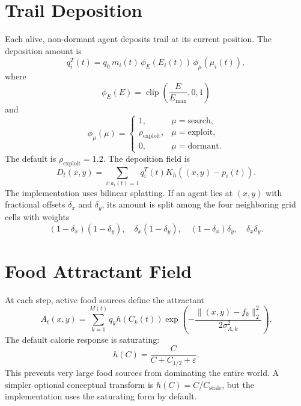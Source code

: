 \documentclass[11pt]{article}
\begin{document}
\section{Trail Deposition}
Each alive, non-dormant agent deposits trail at its current position. The
deposition amount is
\begin{equation}
  q_i^T(t)=q_0\,m_i(t)\,\phi_E(E_i(t))\,\phi_\mu(\mu_i(t)),
\end{equation}
where
\begin{equation}
  \phi_E(E)=\operatorname{clip}\left(\frac{E}{E_{\max}},0,1\right)
\end{equation}
and
\begin{equation}
  \phi_\mu(\mu)=
  \begin{cases}
  1, & \mu=\mathrm{search},\\
  \rho_{\mathrm{exploit}}, & \mu=\mathrm{exploit},\\
  0, & \mu=\mathrm{dormant}.
  \end{cases}
\end{equation}
The default is $\rho_{\mathrm{exploit}}=1.2$. The deposition field is
\begin{equation}
  D_t(x,y)=\sum_{i:a_i(t)=1}q_i^T(t)K_h((x,y)-p_i(t)).
\end{equation}
The implementation uses bilinear splatting. If an agent lies at $(x,y)$ with
fractional offsets $\delta_x$ and $\delta_y$, its amount is split among the four
neighboring grid cells with weights
\begin{equation}
  (1-\delta_x)(1-\delta_y),\quad
  \delta_x(1-\delta_y),\quad
  (1-\delta_x)\delta_y,\quad
  \delta_x\delta_y.
\end{equation}

\section{Food Attractant Field}
At each step, active food sources define the attractant
\begin{equation}
  A_t(x,y)=\sum_{k=1}^{M(t)}
  q_k h(C_k(t))
  \exp\left(-\frac{\|(x,y)-f_k\|_2^2}{2\sigma_{A,k}^2}\right).
\end{equation}
The default calorie response is saturating:
\begin{equation}
  h(C)=\frac{C}{C+C_{1/2}+\varepsilon}.
\end{equation}
This prevents very large food sources from dominating the entire world. A
simpler optional conceptual transform is $h(C)=C/C_{\mathrm{scale}}$, but the
implementation uses the saturating form by default.
\end{document}
